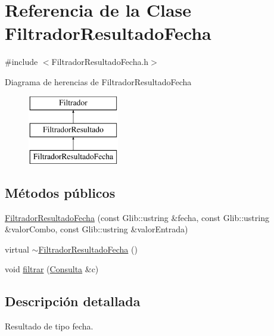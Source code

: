 \hypertarget{classFiltradorResultadoFecha}{\section{\-Referencia de la \-Clase \-Filtrador\-Resultado\-Fecha}
\label{classFiltradorResultadoFecha}
}


{\ttfamily \#include $<$\-Filtrador\-Resultado\-Fecha.\-h$>$}

\-Diagrama de herencias de \-Filtrador\-Resultado\-Fecha\begin{figure}[H]
\begin{center}
\leavevmode
\includegraphics[height=3.000000cm]{classFiltradorResultadoFecha}
\end{center}
\end{figure}
\subsection*{\-Métodos públicos}
\begin{DoxyCompactItemize}
\item 
\hyperlink{classFiltradorResultadoFecha_a709082626c3459d77c1e8a8fe59cea21}{\-Filtrador\-Resultado\-Fecha} (const \-Glib\-::ustring \&fecha, const \-Glib\-::ustring \&valor\-Combo, const \-Glib\-::ustring \&valor\-Entrada)
\item 
virtual \hyperlink{classFiltradorResultadoFecha_a26ac3b00b0ecc7c3a5e88520eb64382d}{$\sim$\-Filtrador\-Resultado\-Fecha} ()
\item 
void \hyperlink{classFiltradorResultadoFecha_a20ed031918bc5f788c8388ab6b26d24c}{filtrar} (\hyperlink{classConsulta}{\-Consulta} \&c)
\end{DoxyCompactItemize}


\subsection{\-Descripción detallada}
\-Resultado de tipo fecha. 

